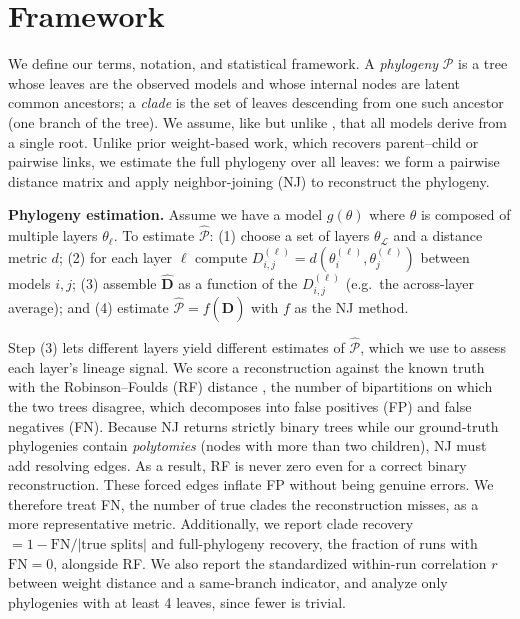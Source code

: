 \documentclass{article}
\theoremstyle{definition}
\theoremstyle{plain}
\begin{document}
\section{Framework}
\label{sec:framework}

We define our terms, notation, and statistical framework. A \emph{phylogeny} $\mathcal{P}$ is a tree
whose leaves are the observed models and whose internal nodes are latent common ancestors; a
\emph{clade} is the set of leaves descending from one such ancestor (one branch of the tree). We assume,
like \citet{yu2025neural} but unlike \citet{horwitz2025mother}, that all models derive from a single
root. Unlike prior weight-based work, which recovers parent--child or pairwise links, we estimate the
full phylogeny over all leaves: we form a pairwise distance matrix and apply neighbor-joining (NJ)
\citep{saitou1987neighbor} to reconstruct the phylogeny.

\textbf{Phylogeny estimation.}\label{sec:framework:phylo}
Assume we have a model $g(\theta)$ where $\theta$ is composed of multiple layers $\theta_\ell$. To estimate $\widehat{\mathcal{P}}$: (1) choose a set of layers $\theta_\mathcal{L}$ and a distance metric $d$;
(2) for each layer $\ell$ compute $D_{i,j}^{(\ell)} = d(\theta^{(\ell)}_i, \theta^{(\ell)}_j)$ between models
$i,j$; (3) assemble $\widehat{\mathbf{D}}$ as a function of the $D_{i,j}^{(\ell)}$ (e.g.\ the across-layer
average); and (4) estimate $\widehat{\mathcal{P}} = f(\widehat{\mathbf{D}})$ with $f$ as the NJ method.

Step (3) lets different layers yield different estimates of $\widehat{\mathcal{P}}$, which we use to
assess each layer's lineage signal. We score a reconstruction against the known truth with the
Robinson--Foulds (RF) distance \citep{robinson1981comparison}, the number of bipartitions on which the
two trees disagree, which decomposes into false positives (FP) and false negatives (FN). Because NJ
returns strictly binary trees while our ground-truth phylogenies contain \textit{polytomies} (nodes with
more than two children), NJ must add resolving edges. As a result, RF is never zero even for a correct binary
reconstruction. These forced edges inflate FP without being genuine errors. We therefore treat FN, the
number of true clades the reconstruction misses, as a more representative metric. Additionally, we report clade
recovery $= 1 - \mathrm{FN}/|\text{true splits}|$ and full-phylogeny recovery, the fraction of
runs with $\mathrm{FN}=0$, alongside RF. We also report the standardized within-run correlation $r$
between weight distance and a same-branch indicator, and analyze only phylogenies with at least 4 leaves, since fewer is trivial.
\end{document}
